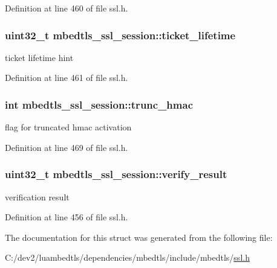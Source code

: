 Definition at line 460 of file ssl.\-h.

\hypertarget{structmbedtls__ssl__session_a0d6aad183f79d64f7eee544cd5277be2}{
\subsubsection[{ticket\-\_\-lifetime}]{\setlength{\rightskip}{0pt plus 5cm}uint32\-\_\-t mbedtls\-\_\-ssl\-\_\-session\-::ticket\-\_\-lifetime}}\label{structmbedtls__ssl__session_a0d6aad183f79d64f7eee544cd5277be2}
ticket lifetime hint 

Definition at line 461 of file ssl.\-h.

\hypertarget{structmbedtls__ssl__session_ad782325576a5b4c06bf55e2b9f2c7bcc}{
\subsubsection[{trunc\-\_\-hmac}]{\setlength{\rightskip}{0pt plus 5cm}int mbedtls\-\_\-ssl\-\_\-session\-::trunc\-\_\-hmac}}\label{structmbedtls__ssl__session_ad782325576a5b4c06bf55e2b9f2c7bcc}
flag for truncated hmac activation 

Definition at line 469 of file ssl.\-h.

\hypertarget{structmbedtls__ssl__session_a7767cf999b47eaa545fb6a86b3447a20}{
\subsubsection[{verify\-\_\-result}]{\setlength{\rightskip}{0pt plus 5cm}uint32\-\_\-t mbedtls\-\_\-ssl\-\_\-session\-::verify\-\_\-result}}\label{structmbedtls__ssl__session_a7767cf999b47eaa545fb6a86b3447a20}
verification result 

Definition at line 456 of file ssl.\-h.



The documentation for this struct was generated from the following file\-:\begin{DoxyCompactItemize}
\item 
C\-:/dev2/luambedtls/dependencies/mbedtls/include/mbedtls/\hyperlink{ssl_8h}{ssl.\-h}\end{DoxyCompactItemize}
